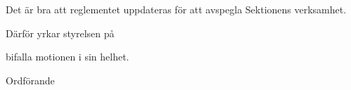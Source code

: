 \documentclass[../_main/handlingar.tex]{subfiles}
\begin{document}
\motionssvar

Det är bra att reglementet uppdateras för att avspegla Sektionens verksamhet.

Därför yrkar styrelsen på
\begin{attsatser}
    \att bifalla motionen i sin helhet.
\end{attsatser}

\begin{signatures}{1}
    \ist
    \signature{\ordf}{Ordförande}
\end{signatures}
\end{document}
